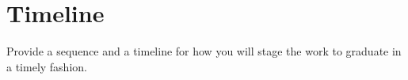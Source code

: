 \section{Timeline}
\label{sec:timeline}
Provide a sequence and a timeline for how you will stage the work to graduate in a timely fashion.